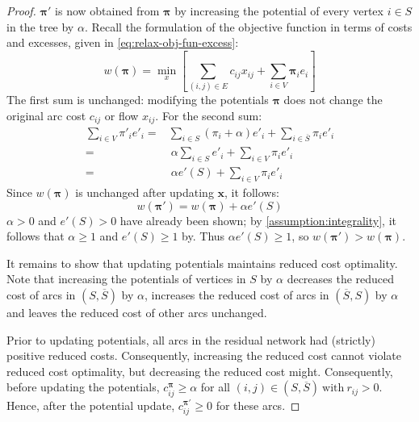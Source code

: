 \begin{proof}
    $\boldsymbol{\pi}'$ is now obtained from $\boldsymbol{\pi}$ by increasing the potential of every vertex $i \in S$ in the tree by $\alpha$. Recall the formulation of the objective function in terms of costs and excesses, given in \cref{eq:relax-obj-fun-excess}:
    \[w\left(\boldsymbol{\pi}\right)=\min_{x}\left[\sum_{\left(i,j\right)\in E}c_{ij}x_{ij}+\sum_{i\in V}\boldsymbol{\pi}_{i}e_{i}\right]\]
    The first sum is unchanged: modifying the potentials $\boldsymbol{\pi}$ does not change the original arc cost $c_{ij}$ or flow $x_{ij}$. For the second sum:
    \begin{align*}
    \sum_{i\in V}\pi'_{i}e'_{i}= & \sum_{i\in S}\left(\pi_{i}+\alpha\right)e'_{i}+\sum_{i\in\overline{S}}\pi_{i}e'_{i}\\
    = &\:\alpha\sum_{i\in S}e'_{i}+\sum_{i\in V}\pi_{i}e'_{i}\\
    = &\:\alpha e'(S)+\sum_{i\in V}\pi_{i}e'_{i}
    \end{align*}
    Since $w\left(\boldsymbol{\pi}\right)$ is unchanged after updating $\mathbf{x}$, it follows:
    \[w\left(\boldsymbol{\pi}'\right)=w(\boldsymbol{\pi})+\alpha e'(S)\]
    $\alpha > 0$ and $e'(S) > 0$ have already been shown; by \cref{assumption:integrality}, it follows that $\alpha \geq 1 $ and $e'(S) \geq 1$ by. Thus $\alpha e'(S) \geq 1$, so $w\left(\boldsymbol{\pi}'\right) > w\left(\boldsymbol{\pi}\right)$.
    
    It remains to show that updating potentials maintains reduced cost optimality. Note that increasing the potentials of vertices in $S$ by $\alpha$ decreases the reduced cost of arcs in $\left(S,\overline{S}\right)$ by $\alpha$, increases the reduced cost of arcs in $\left(\overline{S},S\right)$ by $\alpha$ and leaves the reduced cost of other arcs unchanged.
    
    Prior to updating potentials, all arcs in the residual network had (strictly) positive reduced costs. Consequently, increasing the reduced cost cannot violate reduced cost optimality\footnotemark, but decreasing the reduced cost might. Consequently, before updating the potentials, $c_{ij}^{\boldsymbol{\pi}} \geq \alpha$ for all $(i,j)\in\left(S,\overline{S}\right)\:\mbox{with}\:r_{ij}>0$. Hence, after the potential update, $c_{ij}^{\boldsymbol{\pi}'}\geq 0$ for these arcs.
\end{proof}

